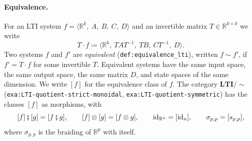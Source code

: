 \documentclass[11pt,a4paper]{article}
\theoremstyle{plain}
\theoremstyle{definition}
\theoremstyle{remark}
\newcommand{\R}{\mathbb{R}}
\newcommand{\id}{\mathrm{id}}
\newcommand{\then}{\mathbin{\fatsemi}}
\newcommand{\LTIq}{\mathbf{LTI}/{\sim}}
\newcommand{\sys}[5]{\bigl\langle #1,\ #2,\ #3,\ #4,\ #5 \bigr\rangle}
\newcommand{\lbl}[1]{\nolinkurl{#1}}
\begin{document}
\paragraph{Equivalence.}
For an LTI system $f = \sys{\R^k}{A}{B}{C}{D}$ and an invertible matrix $T \in \R^{k \times k}$ we write
\begin{equation}
    \label{eq:action}
    T \cdot f \coloneqq \sys{\R^k}{T A T^{-1}}{T B}{C T^{-1}}{D} .
\end{equation}
Two systems $f$ and $f'$ are \emph{equivalent} (\lbl{def:equivalence_lti}), written $f \sim f'$, if $f' = T \cdot f$ for some invertible $T$.
Equivalent systems have the same input space, the same output space, the same matrix $D$, and state spaces of the same dimension.
We write $[f]$ for the equivalence class of $f$.
The category $\LTIq$ (\lbl{exa:LTI-quotient-strict-monoidal}, \lbl{exa:LTI-quotient-symmetric}) has the classes $[f]$ as morphisms, with
\begin{equation}
    \label{eq:quotient-operations}
    [f] \then [g] = [f \then g],
    \qquad
    [f] \otimes [g] = [f \otimes g],
    \qquad
    \id_{\R^n} = [\id_n],
    \qquad
    \sigma_{p,p} = [s_{p,p}] ,
\end{equation}
where $\sigma_{p,p}$ is the braiding of $\R^p$ with itself.
\end{document}
